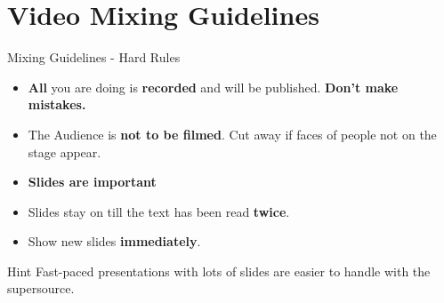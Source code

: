 \documentclass[aspectratio=169]{beamer}
\begin{document}

\section{Video Mixing Guidelines}
\begin{frame}{Mixing Guidelines - Hard Rules}
	\begin{itemize}
		\item \textbf{All} you are doing is \textbf{recorded} and will be published. \alert{\textbf{Don't make mistakes.}}
		\item The Audience is \textbf{not to be filmed}. Cut away if faces of people not on the stage appear.
		\item \textbf{Slides are important}
		\item Slides stay on till the text has been read \textbf{twice}.
		\item Show new slides \textbf{immediately}.
	\end{itemize}
	\begin{exampleblock}{Hint}
		Fast-paced presentations with lots of slides are easier to handle with the supersource.
	\end{exampleblock}
\end{frame}
\end{document}
